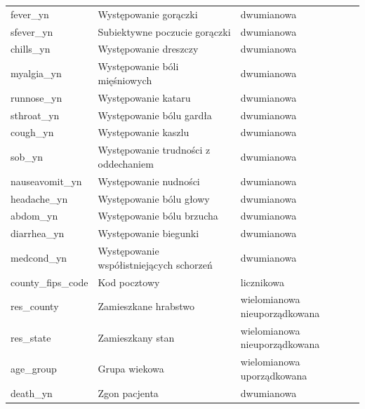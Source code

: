\documentclass[polish, twoside, 12pt, a4paper]{article}
\theoremstyle{definition}
\theoremstyle{plain}
\theoremstyle{remark}
\begin{document}
\begin{landscape}
{\begin{longtable}{lll}
fever\_yn                 & Występowanie gorączki                                & dwumianowa                    \\
sfever\_yn                & Subiektywne poczucie gorączki                        & dwumianowa                    \\
chills\_yn                & Występowanie dreszczy                                & dwumianowa                    \\
myalgia\_yn               & Występowanie bóli mięśniowych                        & dwumianowa                    \\
runnose\_yn               & Występowanie kataru                                  & dwumianowa                    \\
sthroat\_yn               & Występowanie bólu gardła                             & dwumianowa                    \\
cough\_yn                 & Występowanie kaszlu                                  & dwumianowa                    \\
sob\_yn                   & Występowanie trudności z oddechaniem                 & dwumianowa                    \\
nauseavomit\_yn           & Występowanie nudności                                & dwumianowa                    \\
headache\_yn              & Występowanie bólu głowy                              & dwumianowa                    \\
abdom\_yn                 & Występowanie bólu brzucha                            & dwumianowa                    \\
diarrhea\_yn              & Występowanie biegunki                                & dwumianowa                    \\
medcond\_yn               & Występowanie współistniejących schorzeń              & dwumianowa                    \\
county\_fips\_code        & Kod pocztowy                                         & licznikowa                    \\
res\_county               & Zamieszkane hrabstwo                                 & wielomianowa nieuporządkowana \\
res\_state                & Zamieszkany stan                                     & wielomianowa nieuporządkowana \\
age\_group                & Grupa wiekowa                                        & wielomianowa uporządkowana    \\
death\_yn                 & Zgon pacjenta                                        & dwumianowa                    \\
 \hline
\end{longtable}


}
\end{landscape}
\end{document}
